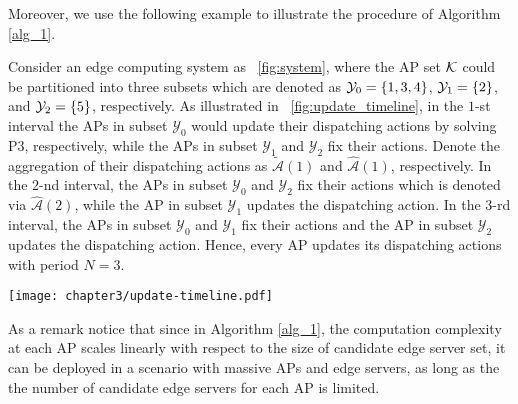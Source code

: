 Moreover, we use the following example to illustrate the procedure of Algorithm \ref{alg_1}.
\begin{example}
    \label{exp:update}
    Consider an edge computing system as \figurename~\ref{fig:system}, where the AP set $\mathcal{K}$ could be partitioned into three subsets which are denoted as $\mathcal{Y}_{0} = \{1,3,4\}$, $\mathcal{Y}_{1} = \{2\}$, and $\mathcal{Y}_{2} = \{5\}$, respectively.
    As illustrated in \figurename~\ref{fig:update_timeline}, in the $1$-st interval the APs in subset $\mathcal{Y}_{0}$ would update their dispatching actions by solving P3, respectively, while the APs in subset $\mathcal{Y}_{1}$ and $\mathcal{Y}_{2}$ fix their actions.
    Denote the aggregation of their dispatching actions as $\tilde{\mathcal{A}}(1)$ and $\hat{\mathcal{A}}(1)$, respectively.
    In the $2$-nd interval, the APs in subset $\mathcal{Y}_{0}$ and $\mathcal{Y}_{2}$ fix their actions which is denoted via $\hat{\mathcal{A}}(2)$, while 
    the AP in subset $\mathcal{Y}_{1}$ updates the dispatching action. %
    In the $3$-rd interval, the APs in subset $\mathcal{Y}_{0}$ and $\mathcal{Y}_{1}$ fix their actions and the AP in subset $\mathcal{Y}_{2}$ updates the dispatching action.
    Hence, every AP {updates} its dispatching actions with period $N=3$.
    \begin{figure*}[htp!]
        \centering
        \texttt{[image: chapter3/update-timeline.pdf]}
        \caption{The Illustration of Example \ref{exp:update}.}
        \label{fig:update_timeline}
    \end{figure*}
\end{example}

As a remark notice that since in Algorithm \ref{alg_1}, the computation complexity at each AP scales linearly with respect to {the size of candidate edge server set}, it can be deployed in a scenario with massive APs and edge servers, as long as the {the number of candidate edge servers for each AP} is limited.

